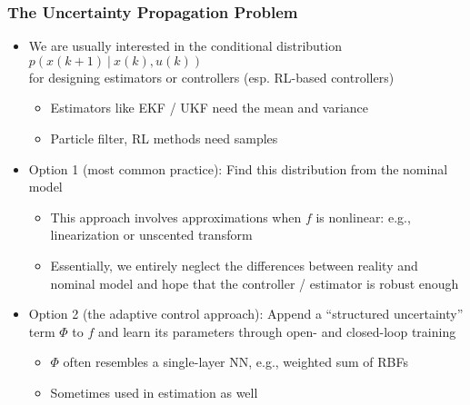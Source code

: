 \documentclass[aspectratio=169,handout]{beamer} 	%
\begin{document}
\begin{frame}
	\frametitle{The Uncertainty Propagation Problem}
	\begin{itemize}[<+->]
		\itemsep\baselineskip
		\item We are usually interested in the conditional distribution
		$p(x(k + 1) ~|~ x(k), u(k))$ \\
		for designing estimators or controllers (esp. RL-based controllers)
		\begin{itemize}
			\item Estimators like EKF / UKF need the mean and variance
			\item Particle filter, RL methods need samples 
		\end{itemize}
		
		\item \alert{Option 1} (most common practice): Find this distribution 
		from the nominal model
		\begin{itemize}
			\item This approach involves approximations when $f$ is nonlinear:
			e.g., linearization or unscented transform
			\item Essentially, we entirely neglect the differences between reality 
			and nominal model and hope that the controller / estimator is robust enough
		\end{itemize}
		
		\item \alert{Option 2} (the adaptive control approach): Append a ``structured
		uncertainty'' term $\Phi$ to $f$ and learn its parameters through open- and 
		closed-loop training
		\begin{itemize}
			\item $\Phi$ often resembles a single-layer NN, e.g., weighted sum of RBFs
			
			\item Sometimes used in estimation as well
					
		\end{itemize}
		
	\end{itemize}
	
\end{frame}
\end{document}
